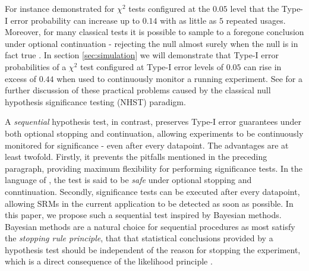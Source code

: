 \documentclass[11pt]{article}
\begin{document}
For instance \cite{armitage} demonstrated for $\chi^2$ tests configured at the $0.05$ level that the Type-I error probability can increase up to $0.14$ with as little as $5$ repeated usages.
Moreover, for many classical tests it is possible to sample to a foregone conclusion under optional continuation - rejecting the null almost surely when the null is in fact true \cite{anscombe}.
In section \ref{sec:simulation} we will demonstrate that Type-I error probabilities of a $\chi^2$ test configured at Type-I error levels of $0.05$ can rise in excess of $0.44$ when used to continuously monitor a running experiment.
See \cite{psychological} for a further discussion of these practical problems caused by the classical null hypothesis significance testing (NHST) paradigm.

A \textit{sequential} hypothesis test, in contrast, preserves Type-I error guarantees under both optional stopping and continuation, allowing experiments to be continuously monitored for significance - even after every datapoint.
The advantages are at least twofold. Firstly, it prevents the pitfalls mentioned in the preceding paragraph, providing maximum flexibility for performing significance tests.
In the language of \cite{safe}, the test is said to be \textit{safe} under optional stopping and conntinuation.
Secondly, significance tests can be executed after every datapoint, allowing SRMs in the current application to be detected as soon as possible.
In this paper, we propose such a sequential test inspired by Bayesian methods.
Bayesian methods are a natural choice for sequential procedures as most satisfy the \textit{stopping rule principle}, that that statistical conclusions provided by a hypothesis test should be independent of the reason for stopping the experiment, which is a direct consequence of the likelihood principle \citep{likelihood}.
\end{document}

